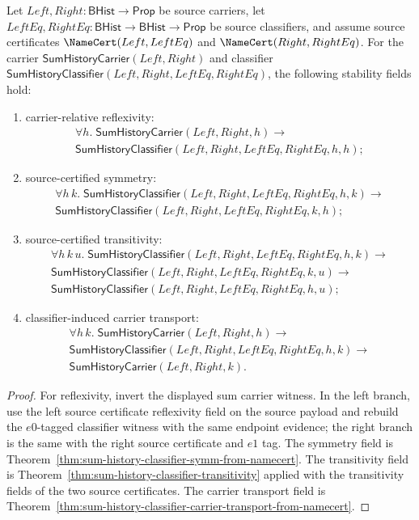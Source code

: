 \begin{theorem}
\label{thm:sum-history-classifier-source-certified-stability-fields}
Let $Left,Right:\mathsf{BHist}\to\mathsf{Prop}$ be source carriers, let
$LeftEq,RightEq:\mathsf{BHist}\to\mathsf{BHist}\to\mathsf{Prop}$ be source
classifiers, and assume source certificates $\NameCert(Left,LeftEq)$ and
$\NameCert(Right,RightEq)$. For the carrier
$\mathsf{SumHistoryCarrier}(Left,Right)$ and classifier
$\mathsf{SumHistoryClassifier}(Left,Right,LeftEq,RightEq)$, the following
stability fields hold:
\begin{enumerate}
  \item carrier-relative reflexivity:
  $$
  \begin{array}{l}
  \forall h.\;\mathsf{SumHistoryCarrier}(Left,Right,h)\to\\
  \mathsf{SumHistoryClassifier}(Left,Right,LeftEq,RightEq,h,h);
  \end{array}
  $$
  \item source-certified symmetry:
  $$
  \begin{array}{l}
  \forall h\,k.\;\mathsf{SumHistoryClassifier}(Left,Right,LeftEq,RightEq,h,k)\to\\
  \mathsf{SumHistoryClassifier}(Left,Right,LeftEq,RightEq,k,h);
  \end{array}
  $$
  \item source-certified transitivity:
  $$
  \begin{array}{l}
  \forall h\,k\,u.\;\mathsf{SumHistoryClassifier}(Left,Right,LeftEq,RightEq,h,k)\to\\
  \mathsf{SumHistoryClassifier}(Left,Right,LeftEq,RightEq,k,u)\to\\
  \mathsf{SumHistoryClassifier}(Left,Right,LeftEq,RightEq,h,u);
  \end{array}
  $$
  \item classifier-induced carrier transport:
  $$
  \begin{array}{l}
  \forall h\,k.\;\mathsf{SumHistoryCarrier}(Left,Right,h)\to\\
  \mathsf{SumHistoryClassifier}(Left,Right,LeftEq,RightEq,h,k)\to\\
  \mathsf{SumHistoryCarrier}(Left,Right,k).
  \end{array}
  $$
\end{enumerate}
\end{theorem}
\begin{proof}
For reflexivity, invert the displayed sum carrier witness. In the left branch,
use the left source certificate reflexivity field on the source payload and
rebuild the $e0$-tagged classifier witness with the same endpoint evidence; the
right branch is the same with the right source certificate and $e1$ tag. The
symmetry field is Theorem~\ref{thm:sum-history-classifier-symm-from-namecert}.
The transitivity field is Theorem~\ref{thm:sum-history-classifier-transitivity}
applied with the transitivity fields of the two source certificates. The
carrier transport field is
Theorem~\ref{thm:sum-history-classifier-carrier-transport-from-namecert}.
\end{proof}

